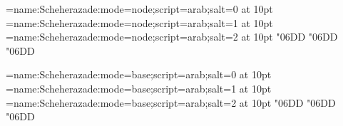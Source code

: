 
\font\0=name:Scheherazade:mode=node;script=arab;salt=0 at 10pt
\font\1=name:Scheherazade:mode=node;script=arab;salt=1 at 10pt
\font\2=name:Scheherazade:mode=node;script=arab;salt=2 at 10pt
\0 \char"06DD
\1 \char"06DD
\2 \char"06DD

\font\0=name:Scheherazade:mode=base;script=arab;salt=0 at 10pt
\font\1=name:Scheherazade:mode=base;script=arab;salt=1 at 10pt
\font\2=name:Scheherazade:mode=base;script=arab;salt=2 at 10pt
\0 \char"06DD
\1 \char"06DD
\2 \char"06DD
\bye
\bye
